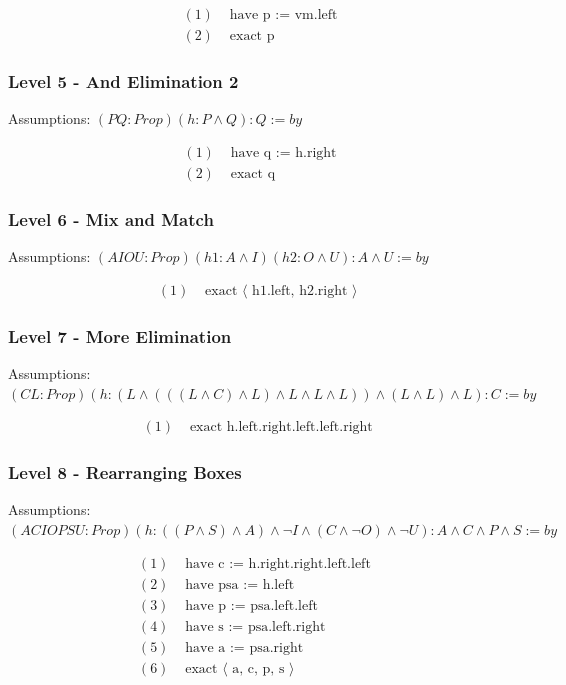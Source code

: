\documentclass{article}
\theoremstyle{theorem}
\theoremstyle{definition}
\theoremstyle{remark}
\begin{document}
\[
\begin{aligned}
  (1)& \text{ have p } \text{:= vm.left}\\
  (2)& \text{ exact p}
\end{aligned}
\]

\subsubsection*{Level 5 - And Elimination 2}
Assumptions: $(P Q : Prop)(h: P \wedge Q) : Q := by$

\[
\begin{aligned}
  (1)& \text{ have q } \text{:= h.right}\\
  (2)& \text{ exact q}
\end{aligned}
\]

\subsubsection*{Level 6 - Mix and Match}
Assumptions: $(A I O U : Prop)(h1 : A \wedge I)(h2 : O \wedge U) : A \wedge U := by$

\[
\begin{aligned}
  (1)& \text{ exact ⟨ h1.left, h2.right ⟩ }
\end{aligned}
\]

\subsubsection*{Level 7 - More Elimination}
Assumptions: $(C L : Prop)(h: (L \wedge (((L \wedge C) \wedge L) \wedge L \wedge L \wedge L)) \wedge (L \wedge L) \wedge L) : C := by$

\[
\begin{aligned}
  (1)& \text{ exact h.left.right.left.left.right }
\end{aligned}
\]

\subsubsection*{Level 8 - Rearranging Boxes}
Assumptions: $(A C I O P S U : Prop)(h: ((P \wedge S) \wedge A) \wedge \neg I \wedge (C \wedge ¬O) \wedge ¬U) : A \wedge C \wedge P \wedge S := by$

\[
\begin{aligned}
  (1)& \text{ have c } \text{:= h.right.right.left.left}&\\
  (2)& \text{ have psa } \text{:= h.left}&\\
  (3)& \text{ have p } \text{:= psa.left.left}&\\
  (4)& \text{ have s } \text{:= psa.left.right}&\\
  (5)& \text{ have a } \text{:= psa.right}&\\
  (6)& \text{ exact ⟨ a, c, p, s ⟩ }
\end{aligned}
\]
\end{document}
